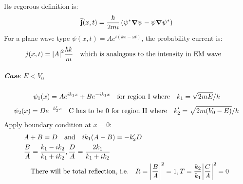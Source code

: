 \documentclass[a4paper,10pt]{article}
\begin{document}
Its regorous definition is:
$$\va{j}(x,t)=\frac{\hbar}{2mi}\left(\psi^\ast\grad\psi-\psi\grad\psi^\ast\right)$$
For a plane wave type $\psi(x,t)=Ae^{i(kx-\omega t)}$, the probability current is:
$$j(x,t)=\abs{A}^2\frac{\hbar k}{m}\qq{which is analogous to the intensity in EM wave}$$
\subparagraph{Case $E<V_0$}
$$\psi_1(x)=Ae^{ik_1x}+Be^{-ik_1x}\qq{for region I where}k_1=\sqrt{2mE}/\hbar$$
$$\psi_2(x)=De^{-k_2^\prime x}\qq{C has to be 0 for region II where}k_2^\prime=\sqrt{2m(V_0-E)}/\hbar$$
Apply boundary condition at $x=0$:
\begin{align*}
     & A+B=D\qq{and}ik_1(A-B)=-k_2^\prime D                                                                    \\
     & \frac{B}{A}=\frac{k_1-ik_2}{k_1+ik_2},\frac{D}{A}=\frac{2k_1}{k_1+ik_2}                                 \\
     & \qq{There will be total reflection, i.e.}R=\abs{\frac{B}{A}}^2=1,T=\frac{k_2}{k_1}\abs{\frac{C}{A}}^2=0
\end{align*}
\end{document}
